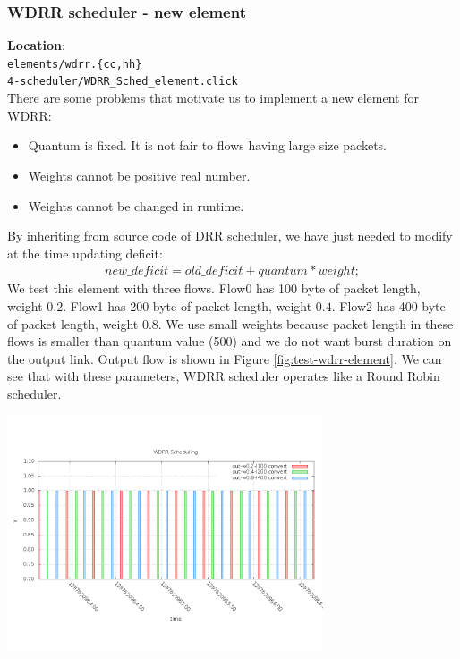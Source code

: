 \documentclass[a4paper]{article}
\begin{document}
  \subsubsection{WDRR scheduler - new element}
  \textbf{Location}: \\
  \texttt{elements/wdrr.\{cc,hh\}} \\ 
  \texttt{4-scheduler/WDRR\_Sched\_element.click}\\
  There are some problems that motivate us to implement a new element for WDRR:
  \begin{itemize}
  	\item Quantum is fixed. It is not fair to flows having large size packets.
  	\item Weights cannot be positive real number.
  	\item Weights cannot be changed in runtime.
  \end{itemize}
  By inheriting from source code of DRR scheduler, we have just needed to modify at the time updating deficit: 
  \begin{align*}
    new\_deficit = old\_deficit + quantum * weight;
  \end{align*}
  We test this element with three flows. Flow0 has 100 byte of packet length, weight $0.2$. Flow1 has 200 byte of packet length, weight $0.4$. Flow2 has 400 byte of packet length, weight $0.8$. We use small weights because packet length in these flows is smaller than quantum value (500) and we do not want burst duration on the output link. Output flow is shown in Figure \ref{fig:test-wdrr-element}. We can see that with these parameters, WDRR scheduler operates like a Round Robin scheduler.
  \begin{center}
	\includegraphics[width=0.70\textwidth]{wdrr-dense-element.png}
	\label{fig:test-wdrr-element}
  \end{center}
  
\end{document}
